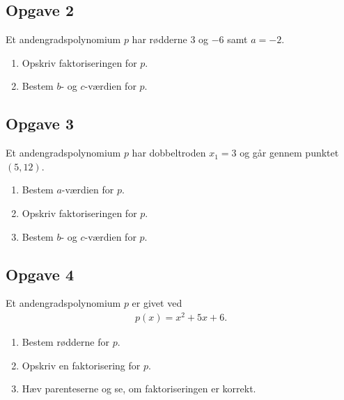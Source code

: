 \subsection*{Opgave 2}
Et andengradspolynomium $p$ har rødderne $3$ og $-6$ samt $a = -2$.
\begin{enumerate}[label=\roman*)]
	\item Opskriv faktoriseringen for $p$. 
	\item Bestem $b$- og $c$-værdien for $p$. 
\end{enumerate}

\subsection*{Opgave 3}
Et andengradspolynomium $p$ har dobbeltroden $x_1 = 3$ og går gennem punktet $(5,12)$.
\begin{enumerate}[label=\roman*)]
	\item Bestem $a$-værdien for $p$.
	\item Opskriv faktoriseringen for $p$.
	\item Bestem $b$- og $c$-værdien for $p$. 
\end{enumerate}

\subsection*{Opgave 4}
Et andengradspolynomium $p$ er givet ved
\begin{align*}
	p(x) = x^2 + 5x + 6.
\end{align*}
\begin{enumerate}[label=\roman*)]
	\item Bestem rødderne for $p$. 
	\item Opskriv en faktorisering for $p$.
	\item Hæv parenteserne og se, om faktoriseringen er korrekt. 
\end{enumerate}

